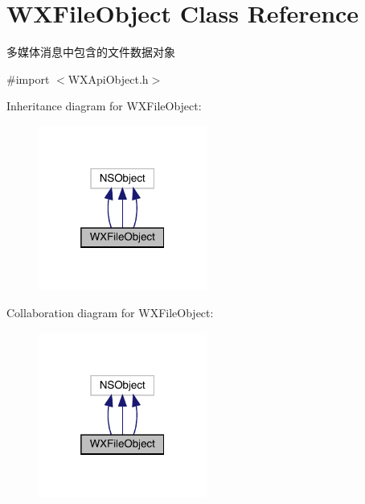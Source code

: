 \hypertarget{interface_w_x_file_object}{}\section{W\+X\+File\+Object Class Reference}
\label{interface_w_x_file_object}


多媒体消息中包含的文件数据对象  




{\ttfamily \#import $<$W\+X\+Api\+Object.\+h$>$}



Inheritance diagram for W\+X\+File\+Object\+:\nopagebreak
\begin{figure}[H]
\begin{center}
\leavevmode
\includegraphics[width=157pt]{interface_w_x_file_object__inherit__graph}
\end{center}
\end{figure}


Collaboration diagram for W\+X\+File\+Object\+:\nopagebreak
\begin{figure}[H]
\begin{center}
\leavevmode
\includegraphics[width=157pt]{interface_w_x_file_object__coll__graph}
\end{center}
\end{figure}
